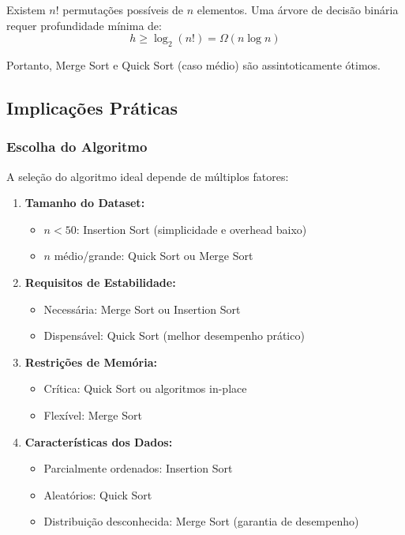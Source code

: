 \documentclass[conference]{IEEEtran}
\begin{document}
Existem $n!$ permutações possíveis de $n$ elementos. Uma árvore de decisão binária requer profundidade mínima de:
\begin{equation}
h \geq \log_2(n!) = \Omega(n \log n)
\end{equation}

Portanto, Merge Sort e Quick Sort (caso médio) são assintoticamente ótimos.

\subsection{Implicações Práticas}

\subsubsection{Escolha do Algoritmo}

A seleção do algoritmo ideal depende de múltiplos fatores:

\begin{enumerate}
    \item \textbf{Tamanho do Dataset:}
    \begin{itemize}
        \item $n < 50$: Insertion Sort (simplicidade e overhead baixo)
        \item $n$ médio/grande: Quick Sort ou Merge Sort
    \end{itemize}

    \item \textbf{Requisitos de Estabilidade:}
    \begin{itemize}
        \item Necessária: Merge Sort ou Insertion Sort
        \item Dispensável: Quick Sort (melhor desempenho prático)
    \end{itemize}

    \item \textbf{Restrições de Memória:}
    \begin{itemize}
        \item Crítica: Quick Sort ou algoritmos in-place
        \item Flexível: Merge Sort
    \end{itemize}

    \item \textbf{Características dos Dados:}
    \begin{itemize}
        \item Parcialmente ordenados: Insertion Sort
        \item Aleatórios: Quick Sort
        \item Distribuição desconhecida: Merge Sort (garantia de desempenho)
    \end{itemize}
\end{enumerate}
\end{document}
